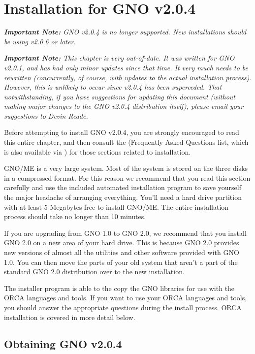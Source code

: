 \documentclass{report}
\begin{document}
\chapter{Installation for GNO v2.0.4}

\em
\textbf{Important Note:}
GNO v2.0.4 is no longer supported.  New installations should be using
v2.0.6 or later.
\rm

\em 
\textbf{Important Note:}
This chapter is very out-of-date.  It was written for GNO v2.0.1, and
has had only minor updates since that time.  It very much needs to
be rewritten (concurrently, of course, with updates to the actual
installation process).  However, this is unlikely to occur since v2.0.4
has been superceded.  That notwithstanding, if you have suggestions
for updating this document (without making major changes
to the GNO v2.0.4 distribution itself), please email
your suggestions to Devin Reade.

Before attempting to install GNO v2.0.4, you are strongly encouraged to 
read this entire chapter, and then consult the 
 (Frequently Asked Questions list, which is also
available via ) for those sections related to installation.
\rm

GNO/ME is a very large system. Most of the
system is stored on the three disks in a compressed format. For
this reason we recommend that you read this section carefully and
use the included automated installation program to save yourself
the major headache of arranging everything. You'll need a hard
drive partition with at least 5 Megabytes free to install GNO/ME.
The entire installation process should take no longer than 10
minutes. 

If you are upgrading from GNO 1.0 to GNO
2.0, we recommend that you install GNO 2.0 on a new area of your
hard drive. This is because GNO 2.0 provides new versions of
almost all the utilities and other software provided with GNO
1.0. You can then move the parts of your old system that aren't a
part of the standard GNO 2.0 distribution over to the new
installation. 

The installer program is able to the copy
the GNO libraries for use with the ORCA languages and tools. If
you want to use your ORCA languages and tools, you should answer
the appropriate questions during the install process. ORCA
installation is covered in more detail below.

\section{Obtaining GNO v2.0.4}
\end{document}
